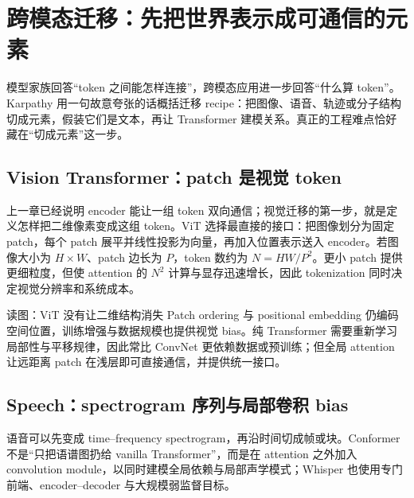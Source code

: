 \section{跨模态迁移：先把世界表示成可通信的元素}

模型家族回答“token 之间能怎样连接”，跨模态应用进一步回答“什么算 token”。Karpathy 用一句故意夸张的话概括迁移 recipe：把图像、语音、轨迹或分子结构切成元素，假装它们是文本，再让 Transformer 建模关系。真正的工程难点恰好藏在“切成元素”这一步。

\subsection{Vision Transformer：patch 是视觉 token}

上一章已经说明 encoder 能让一组 token 双向通信；视觉迁移的第一步，就是定义怎样把二维像素变成这组 token。ViT 选择最直接的接口：把图像划分为固定 patch，每个 patch 展平并线性投影为向量，再加入位置表示送入 encoder。若图像大小为 $H\times W$、patch 边长为 $P$，token 数约为 $N=HW/P^2$。更小 patch 提供更细粒度，但使 attention 的 $N^2$ 计算与显存迅速增长，因此 tokenization 同时决定视觉分辨率和系统成本。


\begin{knowledgebox}{读图：ViT 没有让二维结构消失}
Patch ordering 与 positional embedding 仍编码空间位置，训练增强与数据规模也提供视觉 bias。纯 Transformer 需要重新学习局部性与平移规律，因此常比 ConvNet 更依赖数据或预训练；但全局 attention 让远距离 patch 在浅层即可直接通信，并提供统一接口。
\end{knowledgebox}

\subsection{Speech：spectrogram 序列与局部卷积 bias}

语音可以先变成 time--frequency spectrogram，再沿时间切成帧或块。Conformer 不是“只把语谱图扔给 vanilla Transformer”，而是在 attention 之外加入 convolution module，以同时建模全局依赖与局部声学模式；Whisper 也使用专门前端、encoder--decoder 与大规模弱监督目标。


